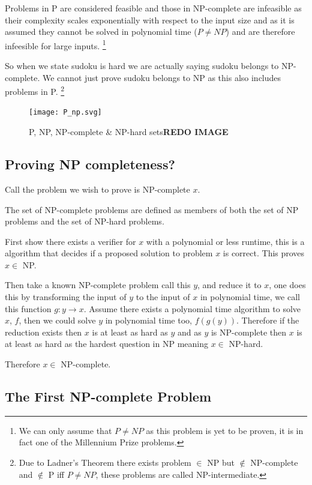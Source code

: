 \documentclass[a4paper,11pt]{report}
\newcounter{row}
\begin{document}
Problems in P are considered feasible and those in NP-complete are infeasible as their complexity scales exponentially with respect to the input size and as it is assumed they cannot be solved in polynomial time ($P \neq NP$) and are therefore infeesible for large inputs. \footnote{We can only assume that $P\neq NP$ as this problem is yet to be proven, it is in fact one of the Millennium Prize problems.}

So when we state sudoku is hard we are actually saying sudoku belongs to NP-complete. We cannot just prove sudoku belongs to NP as this also includes problems in P. \footnote{Due to Ladner's Theorem there exists problem $\in$ NP but $\not\in$ NP-complete and $\not\in$ P iff $P\neq NP$, these problems are called NP-intermediate.}

\begin{figure}[h!]
	\begin{center}
		\texttt{[image: P\_np.svg]}
	\end{center}
	\caption{P, NP, NP-complete \& NP-hard sets\textbf{REDO IMAGE}}
\end{figure}

\subsection{Proving NP completeness?}

Call the problem we wish to prove is NP-complete $x$.

The set of NP-complete problems are defined as members of both the set of NP problems and the set of NP-hard problems. 

First show there exists a verifier for $x$ with a polynomial or less runtime, this is a algorithm that decides if a proposed solution to problem $x$ is correct. This proves $x\in$ NP.

Then take a known NP-complete problem call this $y$, and reduce it to $x$, one does this by transforming the input of $y$ to the input of $x$ in polynomial time, we call this function $g: y\rightarrow x$. Assume there exists a polynomial time algorithm to solve $x$, $f$, then we could solve $y$ in polynomial time too, $f(g(y))$. Therefore if the reduction exists then $x$ is at least as hard as $y$ and as $y$ is NP-complete then $x$ is at least as hard as the hardest question in NP meaning $x \in$ NP-hard.

Therefore $x\in $ NP-complete.

\subsection{The First NP-complete Problem} 
\end{document}

